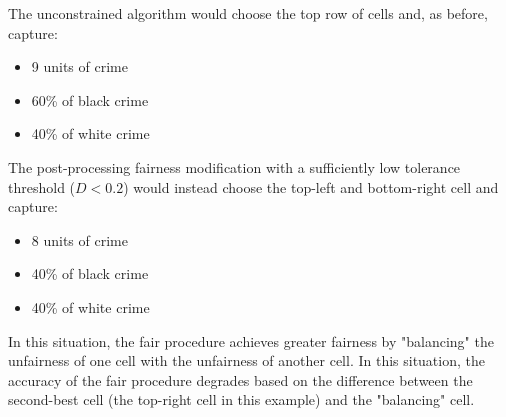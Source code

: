 The unconstrained algorithm would choose the top row of cells and, as before, capture:
\begin{itemize}
    \item 9 units of crime
    \item 60\% of black crime
    \item 40\% of white crime
\end{itemize}
The post-processing fairness modification with a sufficiently low tolerance threshold ($D < 0.2$) would instead choose the top-left and bottom-right cell and capture:
\begin{itemize}
    \item 8 units of crime
    \item 40\% of black crime
    \item 40\% of white crime
\end{itemize}
In this situation, the fair procedure achieves greater fairness by "balancing" the unfairness of one cell with the unfairness of another cell. In this situation, the accuracy of the fair procedure degrades based on the difference between the second-best cell (the top-right cell in this example) and the "balancing" cell.
